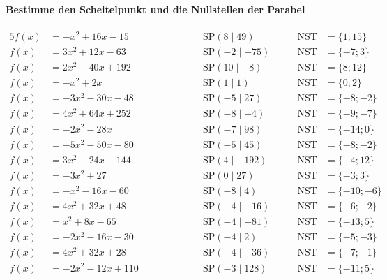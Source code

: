 \documentclass
[
  draft    = true,
  fontsize = 11pt,
  parskip  = half-,
  BCOR     = 0pt,
  DIV      = 11
]
{scrartcl}
\begin{document}
\paragraph{Bestimme den Scheitelpunkt und die Nullstellen der Parabel}
\begin{alignat*}{5}
  f(x)&=-x^{2}+16x-15 \qquad&\qquad \quad&\text{SP}(8\mid49) \quad&\quad \text{NST}&=\{1;15\} \\[0.5ex]
  f(x)&=3x^{2}+12x-63 \qquad&\qquad \quad&\text{SP}(-2\mid-75) \quad&\quad \text{NST}&=\{-7;3\} \\[0.5ex]
  f(x)&=2x^{2}-40x+192 \qquad&\qquad \quad&\text{SP}(10\mid-8) \quad&\quad \text{NST}&=\{8;12\} \\[0.5ex]
  f(x)&=-x^{2}+2x \qquad&\qquad \quad&\text{SP}(1\mid1) \quad&\quad \text{NST}&=\{0;2\} \\[0.5ex]
  f(x)&=-3x^{2}-30x-48 \qquad&\qquad \quad&\text{SP}(-5\mid27) \quad&\quad \text{NST}&=\{-8;-2\} \\[0.5ex]
  f(x)&=4x^{2}+64x+252 \qquad&\qquad \quad&\text{SP}(-8\mid-4) \quad&\quad \text{NST}&=\{-9;-7\} \\[0.5ex]
  f(x)&=-2x^{2}-28x \qquad&\qquad \quad&\text{SP}(-7\mid98) \quad&\quad \text{NST}&=\{-14;0\} \\[0.5ex]
  f(x)&=-5x^{2}-50x-80 \qquad&\qquad \quad&\text{SP}(-5\mid45) \quad&\quad \text{NST}&=\{-8;-2\} \\[0.5ex]
  f(x)&=3x^{2}-24x-144 \qquad&\qquad \quad&\text{SP}(4\mid-192) \quad&\quad \text{NST}&=\{-4;12\} \\[0.5ex]
  f(x)&=-3x^{2}+27 \qquad&\qquad \quad&\text{SP}(0\mid27) \quad&\quad \text{NST}&=\{-3;3\} \\[0.5ex]
  f(x)&=-x^{2}-16x-60 \qquad&\qquad \quad&\text{SP}(-8\mid4) \quad&\quad \text{NST}&=\{-10;-6\} \\[0.5ex]
  f(x)&=4x^{2}+32x+48 \qquad&\qquad \quad&\text{SP}(-4\mid-16) \quad&\quad \text{NST}&=\{-6;-2\} \\[0.5ex]
  f(x)&=x^{2}+8x-65 \qquad&\qquad \quad&\text{SP}(-4\mid-81) \quad&\quad \text{NST}&=\{-13;5\} \\[0.5ex]
  f(x)&=-2x^{2}-16x-30 \qquad&\qquad \quad&\text{SP}(-4\mid2) \quad&\quad \text{NST}&=\{-5;-3\} \\[0.5ex]
  f(x)&=4x^{2}+32x+28 \qquad&\qquad \quad&\text{SP}(-4\mid-36) \quad&\quad \text{NST}&=\{-7;-1\} \\[0.5ex]
  f(x)&=-2x^{2}-12x+110 \qquad&\qquad \quad&\text{SP}(-3\mid128) \quad&\quad \text{NST}&=\{-11;5\} \\[0.5ex]

\end{alignat*}
\end{document}
